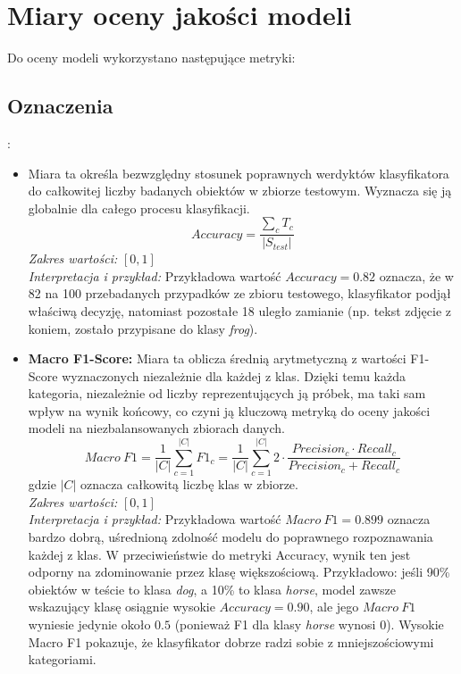 \documentclass[12pt,a4paper]{article}
\begin{document}
\section{Miary oceny jakości modeli}
Do oceny modeli wykorzystano następujące metryki:
\subsection{Oznaczenia}:


\begin{itemize}
        \item Miara ta określa bezwzględny stosunek poprawnych werdyktów klasyfikatora do całkowitej liczby badanych obiektów w zbiorze testowym. Wyznacza się ją globalnie dla całego procesu klasyfikacji.\\ 
        \begin{equation}
            Accuracy = \frac{\sum_{c} T_c}{|S_{test}|} 
        \label{eq:accuracy}
        \end{equation}
        \textit{Zakres wartości:} $[0, 1]$ \\
        \textit{Interpretacja i przykład:} Przykładowa wartość $Accuracy = 0.82$ oznacza, że w 82 na 100 przebadanych przypadków ze zbioru testowego, klasyfikator podjął właściwą decyzję, natomiast pozostałe 18 uległo zamianie (np. tekst zdjęcie z koniem, zostało przypisane do klasy \textit{frog}).

        \item \textbf{Macro F1-Score:} Miara ta oblicza średnią arytmetyczną z wartości F1-Score wyznaczonych niezależnie dla każdej z klas. Dzięki temu każda kategoria, niezależnie od liczby reprezentujących ją próbek, ma taki sam wpływ na wynik końcowy, co czyni ją kluczową metryką do oceny jakości modeli na niezbalansowanych zbiorach danych.\\ 
            \begin{equation}
                Macro\ F1 = \frac{1}{|C|} \sum_{c=1}^{|C|} F1_c = \frac{1}{|C|} \sum_{c=1}^{|C|} 2 \cdot \frac{Precision_c \cdot Recall_c}{Precision_c + Recall_c}
            \label{eq:macro_f1}
            \end{equation}
            gdzie $|C|$ oznacza całkowitą liczbę klas w zbiorze.\\
            \textit{Zakres wartości:} $[0, 1]$ \\
            \textit{Interpretacja i przykład:} Przykładowa wartość $Macro\ F1 = 0.899$ oznacza bardzo dobrą, uśrednioną zdolność modelu do poprawnego rozpoznawania każdej z klas. W przeciwieństwie do metryki Accuracy, wynik ten jest odporny na zdominowanie przez klasę większościową. Przykładowo: jeśli 90\% obiektów w teście to klasa \textit{dog}, a 10\% to klasa \textit{horse}, model zawsze wskazujący klasę  osiągnie wysokie $Accuracy = 0.90$, ale jego $Macro\ F1$ wyniesie jedynie około $0.5$ (ponieważ F1 dla klasy \textit{horse} wynosi 0). Wysokie Macro F1 pokazuje, że klasyfikator dobrze radzi sobie z mniejszościowymi kategoriami.
    

\end{itemize}
\end{document}
